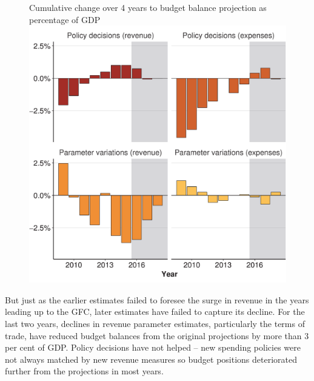 \begin{figure}
%
{Cumulative change over 4 years to budget balance projection as percentage of GDP}
\includegraphics[width=\columnwidth]{Fiscal-challenges/figure/Figure10-wrapped-1.pdf}

\end{figure}

But just as the earlier estimates failed to foresee the surge in revenue in the years leading up to the GFC, later estimates have failed to capture its decline. For the last two years, declines in revenue parameter estimates, particularly the terms of trade, have reduced budget balances from the original projections by more than 3 per cent of GDP\@. Policy decisions have not helped – new spending policies were not always matched by new revenue measures so budget positions deteriorated further from the projections in most years. 

